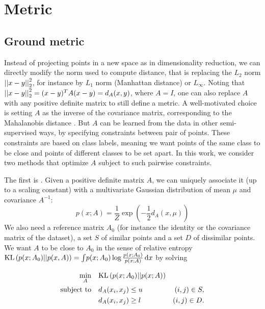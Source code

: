 \section{Metric}
\label{sec:metric}

\subsection{Ground metric}
\label{sub:metric-learning}

Instead of projecting points in a new space as in dimensionality reduction, we
can directly modify the norm used to compute distance, that is replacing the
$L_2$ norm $\left|\left|x-y\right|\right|_2^2$, for instance by $L_1$ norm (Manhattan distance)
or $L_\infty$. Noting that $\left|\left|x-y\right|\right|_2^2 = (x-y)^T A (x-y) = d_A(x,y)$,
where $A=I$, one can also replace $A$ with any positive definite matrix to still
define a metric. A well-motivated choice is setting $A$ as the inverse of the
covariance matrix, corresponding to the Mahalanobis distance
\autocite{Mahalanobis36}. But $A$ can be learned from the data in other
semi-supervised ways, by specifying constraints between pair of points. These
constraints are based on class labels, meaning we want points of the same class
to be close and points of different classes to be set apart. In this work, we
consider two methods that optimize $A$ subject to such pairwise constraints.

The first is 
\autocite{InfoMetric07}. Given a positive definite matrix $A$, we can uniquely
associate it (up to a scaling constant) with a multivariate Gaussian
distribution of mean $\mu$ and covariance $A^{-1}$: \[p(x; A) =
\frac{1}{Z}\exp\left(-\frac{1}{2}d_A(x, \mu)\right)\] We also need a reference
matrix $A_0$ (for instance the identity or the covariance matrix of the
dataset), a set $S$ of similar points and a set $D$ of dissimilar points. We
want $A$ to be close to $A_0$ in the sense of relative entropy $\mathrm{KL}\left(p(x;
A_0)||p(x,A)\right) = \int \! p(x; A_0) \log\frac{p(x; A_0)}{p(x; A)}\, \mathrm{d}x$
by solving

\begin{align*}
	\min_A &\quad \mathrm{KL}\left(p(x; A_0)||p(x; A)\right) &\quad\\
	\text{subject to} &\quad d_A(x_i, x_j) \leq u &(i,j) \in S,\\
 &\quad d_A(x_i, x_j) \geq l &(i,j) \in D.
\end{align*}

